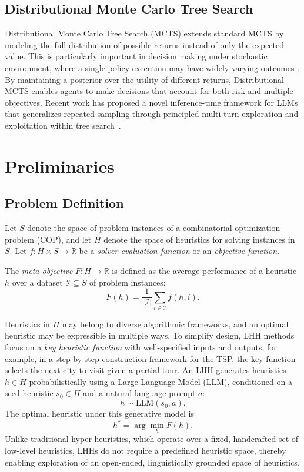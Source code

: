 \documentclass[sigconf,anonymous]{aamas}
\begin{document}
\subsection{Distributional Monte Carlo Tree Search}

Distributional Monte Carlo Tree Search (MCTS) extends standard MCTS by modeling the full distribution of possible returns instead of only the expected value. This is particularly important in decision making under stochastic environment, where a single policy execution may have widely varying outcomes \cite{hayes2021riskawaremultiobjectivedecision, dam2023montecarlotreesearchuncertainty, anonymous2025distributional}. By maintaining a posterior over the utility of different returns, Distributional MCTS enables agents to make decisions that account for both risk and multiple objectives. Recent work has proposed a novel inference-time framework for LLMs that generalizes repeated sampling through principled multi-turn exploration and exploitation within tree search~\cite{inoue2025widerdeeperscalingllm}.


\section{Preliminaries}

\subsection{Problem Definition}

\begin{definition}
Let $S$ denote the space of problem instances of a combinatorial optimization problem (COP), and let $H$ denote the space of heuristics for solving instances in $S$.  
Let $f: H \times S \to \mathbb{R}$ be a \emph{solver evaluation function} or an \emph{objective function}.

The \emph{meta-objective} $F: H \to \mathbb{R}$ is defined as the average performance of a heuristic $h$ over a dataset $\mathcal{I} \subseteq S$ of problem instances:
\[
F(h) = \frac{1}{|\mathcal{I}|} \sum_{i \in \mathcal{I}} f(h, i).
\]

Heuristics in $H$ may belong to diverse algorithmic frameworks, and an optimal heuristic may be expressible in multiple ways. To simplify design, LHH methods focus on a \emph{key heuristic function} with well-specified inputs and outputs; for example, in a step-by-step construction framework for the TSP, the key function selects the next city to visit given a partial tour. An LHH generates heuristics $h \in H$ probabilistically using a Large Language Model (LLM), conditioned on a seed heuristic $s_0 \in H$ and a natural-language prompt $a$:
\[
h \sim \mathrm{LLM}(s_0, a).
\]
The optimal heuristic under this generative model is
\[
h^* = \arg\min_{h} F(h).
\]
Unlike traditional hyper-heuristics, which operate over a fixed, handcrafted set of low-level heuristics, LHHs do not require a predefined heuristic space, thereby enabling exploration of an open-ended, linguistically grounded space of heuristics.
\end{definition}
\end{document}
